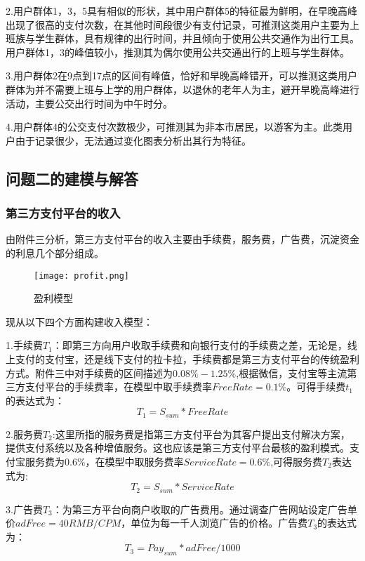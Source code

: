 \documentclass[withoutpreface,bwprint]{cumcmthesis} %
\begin{document}
2.用户群体1，3，5具有相似的形状，其中用户群体5的特征最为鲜明，在早晚高峰出现了很高的支付次数，在其他时间段很少有支付记录，可推测这类用户主要为上班族与学生群体，具有规律的出行时间，并且倾向于使用公共交通作为出行工具。用户群体1，3的峰值较小，推测其为偶尔使用公共交通出行的上班与学生群体。

3.用户群体2在9点到17点的区间有峰值，恰好和早晚高峰错开，可以推测这类用户群体为并不需要上班与上学的用户群体，以退休的老年人为主，避开早晚高峰进行活动，主要公交出行时间为中午时分。

4.用户群体4的公交支付次数极少，可推测其为非本市居民，以游客为主。此类用户由于记录很少，无法通过变化图表分析出其行为特征。

\subsection{问题二的建模与解答}
\subsubsection{第三方支付平台的收入}
由附件三分析，第三方支付平台的收入主要由手续费，服务费，广告费，沉淀资金的利息几个部分组成。
\begin{figure}[h]
\centering
\texttt{[image: profit.png]}
\caption{盈利模型}
\end{figure}
现从以下四个方面构建收入模型：

1.手续费$T_1$：即第三方向用户收取手续费和向银行支付的手续费之差，无论是，线上支付的支付宝，还是线下支付的拉卡拉，手续费都是第三方支付平台的传统盈利方式。附件三中对手续费的区间描述为$0.08\%-1.25\%$,根据微信，支付宝等主流第三方支付平台的手续费率，在模型中取手续费率$FreeRate=0.1\%$。可得手续费$t_1$的表达式为：
\begin{equation}
T_1=S_{sum}*FreeRate
\end{equation}

2.服务费$T_2$:这里所指的服务费是指第三方支付平台为其客户提出支付解决方案，提供支付系统以及各种增值服务。这也应该是第三方支付平台最核的盈利模式。支付宝服务费为$0.6\%$，在模型中取服务费率$ServiceRate=​0.6\%$,可得服务费$T_2$表达式为:
\begin{equation}
T_2=S_{sum}*ServiceRate
\end{equation}

3.广告费$T_3$：为第三方平台向商户收取的广告费用。通过调查广告网站设定广告单价$adFree=40RMB/CPM$，单位为每一千人浏览广告的价格。广告费$T_3$的表达式为：
\begin{equation}
T_3=Pay_{sum}*adFree/1000
\end{equation}
\end{document}
